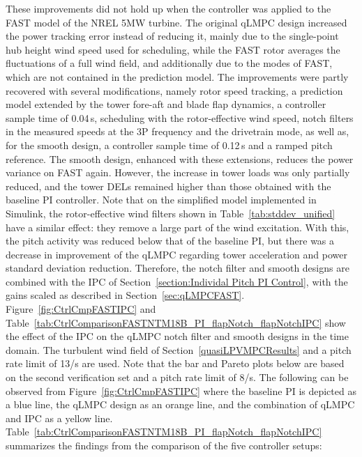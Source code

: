 These improvements did not hold up when the controller was applied to the FAST model of the NREL 5MW
turbine. The original qLMPC design increased the power tracking error instead of reducing it, mainly due to the single-point hub height wind speed used for scheduling, while the FAST rotor averages the fluctuations of a full wind field, and additionally due to the modes of FAST, which are not contained in the prediction model.
%
The improvements were partly recovered with several modifications, namely rotor speed tracking, a prediction model extended by the tower fore-aft and blade flap dynamics, a controller sample time of 0.04\,s, scheduling with the rotor-effective wind speed, notch filters in the measured speeds at the 3P frequency and the drivetrain mode, as well as, for the smooth design, a controller sample time of 0.12\,s and a ramped pitch reference.
%
The smooth design, enhanced with these extensions, reduces the power variance on FAST again. However, the increase in tower
loads was only partially reduced, and the tower DELs remained higher than those obtained with the baseline PI controller. Note that on the simplified model implemented in Simulink, the
rotor-effective wind filters shown in Table~\ref{tab:stddev_unified} have a similar effect: they
remove a large part of the wind excitation. With this, the pitch activity was reduced below that of the baseline PI, but there was a decrease in improvement of the
qLMPC regarding tower acceleration and power standard deviation reduction. 
%
Therefore, the notch filter and smooth designs are combined with the IPC of Section~\ref{section:Individal Pitch PI Control}, with the gains scaled as described in Section~\ref{sec:qLMPCFAST}. Figure~\ref{fig:CtrlCmpFASTIPC} and Table~\ref{tab:CtrlComparisonFASTNTM18B_PI_flapNotch_flapNotchIPC} show the effect of the IPC on the qLMPC notch filter and smooth designs in the time domain. The turbulent wind field of Section~\ref{quasiLPVMPCResults} and a pitch rate limit of 13\textdegree/s are used. Note that the bar and Pareto plots below are based on the second verification set and a pitch rate limit of 8\textdegree/s.
The following can be observed from Figure~\ref{fig:CtrlCmpFASTIPC} where the baseline PI is depicted as a blue line, the qLMPC design as an orange line, and the combination of qLMPC and IPC as a yellow line. Table~\ref{tab:CtrlComparisonFASTNTM18B_PI_flapNotch_flapNotchIPC} summarizes the findings from the comparison of the five controller setups:

